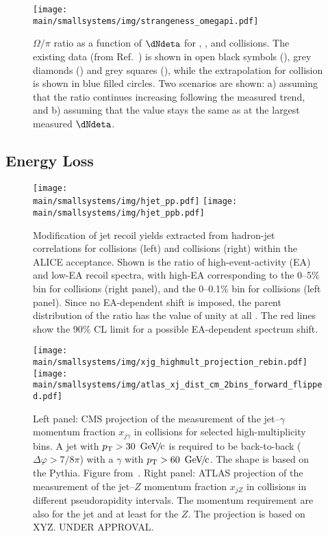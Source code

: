 \documentclass[../report.tex]{subfiles}
\providecommand{\main}{..}
\begin{document}
\begin{figure}[t]
\centering
\texttt{[image: \\main/smallsystems/img/strangeness\_omegapi.pdf]}

\caption{$\Omega/\pi$ ratio as a function of $\dNdeta$ for \pp, \pPb, and \PbPb collisions. The existing data (from Ref.~\cite{ALICE:2017jyt}) is shown in open black symbols (\pp), grey diamonds (\pPb) and grey squares (\PbPb), while the extrapolation for \pp collision is shown in blue filled circles. Two scenarios are shown: a) assuming that the ratio continues increasing following the measured trend, and b) assuming that the value stays the same as at the largest measured $\dNdeta$.}
\label{fig:smallsystems_strangeness_omega_pi}
\end{figure}

\subsection{Energy Loss}
\label{sect:smallsystems_energyloss}

\begin{figure}[t]
\centering
\texttt{[image: \\main/smallsystems/img/hjet\_pp.pdf]}
\hfill
\texttt{[image: \\main/smallsystems/img/hjet\_ppb.pdf]}
\caption{Modification of jet recoil yields extracted from hadron-jet correlations for \pp collisions (left) and \pPb collisions (right) within the ALICE acceptance. Shown is the ratio  of high-event-activity (EA) and low-EA recoil spectra, with high-EA corresponding to the 0--5\% bin for \pPb collisions (right panel), and the 0--0.1\% bin for \pp collisions (left panel). Since no EA-dependent shift is imposed, the parent distribution of the ratio has the value of unity at all \pT. The red lines show the 90\% CL limit for a possible EA-dependent spectrum shift.}
\label{fig:smallsystems_energyloss_hjet}
\end{figure}

\begin{figure}[t]
\centering
\texttt{[image: \\main/smallsystems/img/xjg\_highmult\_projection\_rebin.pdf]}
\hfill
\texttt{[image: \\main/smallsystems/img/atlas\_xj\_dist\_cm\_2bins\_forward\_flipped.pdf]}
\caption{Left panel: CMS projection of the measurement of the jet--$\gamma$ momentum fraction $x_{j\gamma}$ in \pp collisions for selected high-multiplicity bins. A jet with $\pT > \unit[30]{\UGeVc}$ is required to be back-to-back ($\Delta\varphi > 7/8\pi$) with a $\gamma$ with $\pT > \unit[60]{\UGeVc}$. The shape is based on the Pythia. Figure from~\cite{CMS-PAS-FTR-18-025}. Right panel: ATLAS projection of the measurement of the jet--$Z$ momentum fraction $x_{jZ}$ in \pPb collisions in different pseudorapidity intervals. The momentum requirement are also \unit[30]{\UGeVc} for the jet and at least \unit[60]{\UGeVc} for the $Z$. The projection is based on XYZ. UNDER APPROVAL.}
\label{fig:smallsystems_energyloss_xjg_xjz}
\end{figure}
\end{document}
